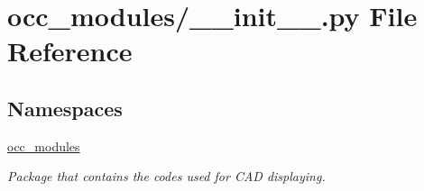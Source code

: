 \hypertarget{a00317}{}\section{occ\+\_\+modules/\+\_\+\+\_\+init\+\_\+\+\_\+.py File Reference}
\label{a00317}
\subsection*{Namespaces}
\begin{DoxyCompactItemize}
\item 
 \hyperlink{a00054}{occ\+\_\+modules}
\begin{DoxyCompactList}\small\item\em Package that contains the codes used for C\+AD displaying. \end{DoxyCompactList}\end{DoxyCompactItemize}
